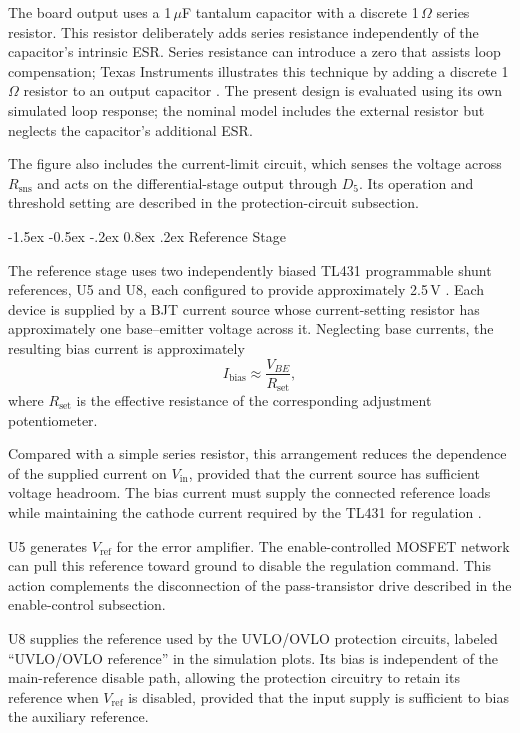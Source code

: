 \documentclass[conference]{IEEEtran}
\makeatletter
\renewcommand\subsection{\@startsection{subsection}{2}{\z@}%
  {-1.5ex \@plus -0.5ex \@minus -.2ex}%
  {0.8ex \@plus .2ex}%
  {\normalfont\sffamily\normalsize\bfseries}}
\makeatother
\begin{document}
The board output uses a 1\,$\mu$F tantalum capacitor with a discrete
1\,$\Omega$ series resistor. This resistor deliberately adds series
resistance independently of the capacitor's intrinsic ESR. Series
resistance can introduce a zero that assists loop compensation;
Texas Instruments illustrates this technique by adding a discrete
1\,$\Omega$ resistor to an output capacitor
\cite{ti_esr_stability_2020}. The present design is evaluated using
its own simulated loop response; the nominal model includes the
external resistor but neglects the capacitor's additional ESR.

The figure also includes the current-limit circuit,
which senses the voltage across \(R_{\mathrm{sns}}\)
and acts on the differential-stage output through
\(D_5\). Its operation and threshold setting are
described in the protection-circuit subsection.

\subsection{Reference Stage}

The reference stage uses two independently biased TL431
programmable shunt references, U5 and U8, each configured
to provide approximately 2.5\,V
\cite{ti_tl431_2024}. Each device is supplied by a BJT
current source whose current-setting resistor has
approximately one base--emitter voltage across it.
Neglecting base currents, the resulting bias current
is approximately
\[
I_{\mathrm{bias}}
\approx
\frac{V_{BE}}{R_{\mathrm{set}}},
\]
where \(R_{\mathrm{set}}\) is the effective resistance
of the corresponding adjustment potentiometer.

Compared with a simple series resistor, this arrangement
reduces the dependence of the supplied current on
\(V_{\mathrm{in}}\), provided that the current source
has sufficient voltage headroom. The bias current must
supply the connected reference loads while maintaining
the cathode current required by the TL431 for regulation
\cite{ti_tl431_2024}.

U5 generates \(V_{\mathrm{ref}}\) for the error amplifier.
The enable-controlled MOSFET network can pull this
reference toward ground to disable the regulation
command. This action complements the disconnection
of the pass-transistor drive described in the
enable-control subsection.

U8 supplies the reference used by the UVLO/OVLO protection
circuits, labeled ``UVLO/OVLO reference'' in the simulation
plots. Its bias is independent
of the main-reference disable path, allowing the
protection circuitry to retain its reference when
\(V_{\mathrm{ref}}\) is disabled, provided that the
input supply is sufficient to bias the auxiliary
reference.
\end{document}
